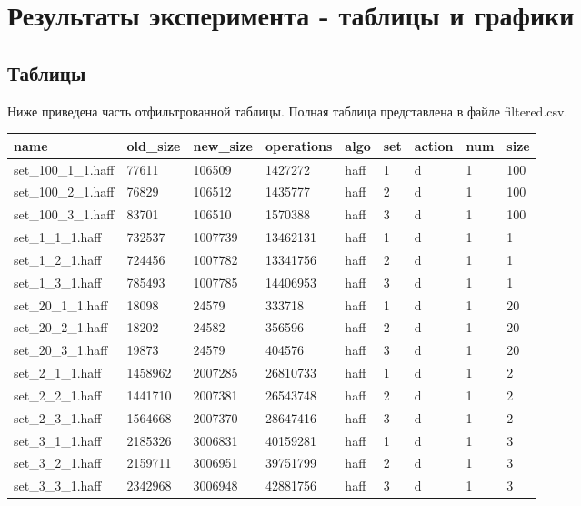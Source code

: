 \documentclass[russian, a4paper, 12pt]{article}
\begin{document}
\section{Результаты эксперимента - таблицы и графики}

\subsection{Таблицы}
Ниже приведена часть отфильтрованной таблицы. Полная таблица представлена в файле filtered.csv.

\begin{tabular}{ | l | l | l | l | l | l | l | l | l | }
\hline
	name & old\_size & new\_size & operations & algo & set & action & num & size \\ \hline
	set\_100\_1\_1.haff & 77611 & 106509 & 1427272 & haff & 1 & d & 1 & 100 \\ \hline
	set\_100\_2\_1.haff & 76829 & 106512 & 1435777 & haff & 2 & d & 1 & 100 \\ \hline
	set\_100\_3\_1.haff & 83701 & 106510 & 1570388 & haff & 3 & d & 1 & 100 \\ \hline
	set\_1\_1\_1.haff & 732537 & 1007739 & 13462131 & haff & 1 & d & 1 & 1 \\ \hline
	set\_1\_2\_1.haff & 724456 & 1007782 & 13341756 & haff & 2 & d & 1 & 1 \\ \hline
	set\_1\_3\_1.haff & 785493 & 1007785 & 14406953 & haff & 3 & d & 1 & 1 \\ \hline
	set\_20\_1\_1.haff & 18098 & 24579 & 333718 & haff & 1 & d & 1 & 20 \\ \hline
	set\_20\_2\_1.haff & 18202 & 24582 & 356596 & haff & 2 & d & 1 & 20 \\ \hline
	set\_20\_3\_1.haff & 19873 & 24579 & 404576 & haff & 3 & d & 1 & 20 \\ \hline
	set\_2\_1\_1.haff & 1458962 & 2007285 & 26810733 & haff & 1 & d & 1 & 2 \\ \hline
	set\_2\_2\_1.haff & 1441710 & 2007381 & 26543748 & haff & 2 & d & 1 & 2 \\ \hline
	set\_2\_3\_1.haff & 1564668 & 2007370 & 28647416 & haff & 3 & d & 1 & 2 \\ \hline
	set\_3\_1\_1.haff & 2185326 & 3006831 & 40159281 & haff & 1 & d & 1 & 3 \\ \hline
	set\_3\_2\_1.haff & 2159711 & 3006951 & 39751799 & haff & 2 & d & 1 & 3 \\ \hline
	set\_3\_3\_1.haff & 2342968 & 3006948 & 42881756 & haff & 3 & d & 1 & 3 \\ \hline

\end{tabular}
\end{document}
